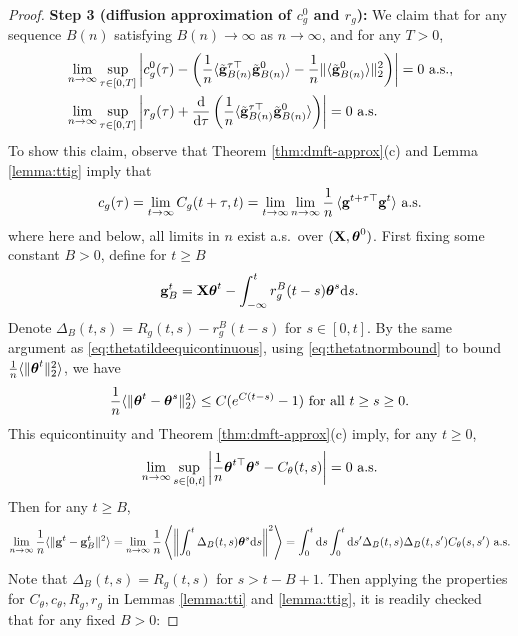 \begin{proof}
{\bf Step 3 (diffusion approximation of $c_g^0$ and $r_g$):} We claim that for any 
sequence $B(n)$ satisfying $B(n) \to \infty$ as $n \to \infty$, and for
any $T>0$,
\begin{align}
&\lim_{n \to \infty}
\sup_{\tau \in [0,T]} \left|c_g^0(\tau)-
\left(\frac{1}{n}\langle \tilde{\mathbf{g}}_{B(n)}^{\tau\top} \tilde {\mathbf{g}}_{B(n)}^0
\rangle-\frac{1}{n}\|\langle \tilde{\mathbf{g}}_{B(n)}^0 \rangle\|_2^2
\right)\right|=0 \text{ a.s.},\label{eq:cgrepr}\\
&\lim_{n \to \infty}
\sup_{\tau \in [0,T]} \left|r_g(\tau)+
\frac{\mathrm{d}}{\mathrm{d}\tau}
\left(\frac{1}{n}\langle \tilde{\mathbf{g}}_{B(n)}^{\tau\top} \tilde {\mathbf{g}}_{B(n)}^0
\rangle\right)\right|=0 \text{ a.s.}\label{eq:rgrepr}
\end{align}
To show this claim, observe that
Theorem \ref{thm:dmft-approx}(c) and Lemma \ref{lemma:ttig} imply that
\begin{equation}\label{eq:cgrepr1}
c_g(\tau)=\lim_{t \to \infty}
C_g(t+\tau,t)=\lim_{t \to \infty} \lim_{n \to \infty} \frac{1}{n}\,
\langle \mathbf{g}^{t+\tau\top} \mathbf{g}^t \rangle \text{ a.s.}
\end{equation}
where here and below, all limits in $n$ exist a.s.\ over $(\mathbf{X},\boldsymbol{\theta}^0)$.
First fixing some constant $B>0$, define for $t \geq B$
\[\mathbf{g}_B^t=\mathbf{X}\boldsymbol{\theta}^t-\int_{-\infty}^t r_g^B(t-s)\boldsymbol{\theta}^s \mathrm{d} s.\]
Denote $\Delta_B(t,s)=R_g(t,s)-r_g^B(t-s)$ for $s \in [0,t]$.
By the same argument as \eqref{eq:thetatildeequicontinuous}, using
\eqref{eq:thetatnormbound} to bound $\frac{1}{n}\langle
\|\boldsymbol{\theta}^t\|_2^2 \rangle$, we have
\begin{equation}\label{eq:thetaequicontinuous}
\frac{1}{n}\langle \|\boldsymbol{\theta}^t-\boldsymbol{\theta}^s\|_2^2 \rangle
\leq C(e^{C(t-s)}-1) \text{ for all } t \geq s \geq 0.
\end{equation}
This equicontinuity and Theorem \ref{thm:dmft-approx}(c) imply, for any $t \geq
0$,
\[\lim_{n \to \infty} \sup_{s \in [0,t]}
\left|\frac{1}{n}\boldsymbol{\theta}^{t\top}\boldsymbol{\theta}^s-C_\theta(t,s)\right|=0 \text{ a.s.}\]
Then for any $t \geq B$,
\begin{align*}
\lim_{n \to \infty} \frac{1}{n}\langle \|\mathbf{g}^t-\mathbf{g}_B^t\|^2 \rangle
=\lim_{n \to \infty} \frac{1}{n}\left\langle \left\|\int_0^t \Delta_B(t,s)
\boldsymbol{\theta}^s \mathrm{d} s\right\|^2\right\rangle
=\int_0^t \mathrm{d} s \int_0^t \mathrm{d} s' \Delta_B(t,s)\Delta_B(t,s')C_\theta(s,s') \text{
a.s.}
\end{align*}
Note that $\Delta_B(t,s)=R_g(t,s)$ for $s>t-B+1$.
Then applying the properties for $C_\theta,c_\theta,R_g,r_g$
in Lemmas \ref{lemma:tti} and \ref{lemma:ttig},
it is readily checked that for any fixed $B>0$:

\end{proof}
